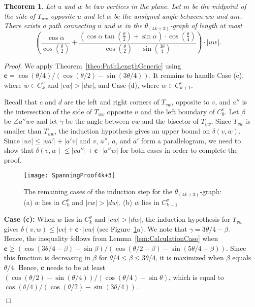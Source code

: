 \documentclass[12pt]{article}
\newtheorem{theo}[defin]{Theorem}
\newenvironment{theorem}{\begin{theo} \sl}{\end{theo}}
\newenvironment{proof}{\emph{Proof.}}{\hfill $\Box$\\}
\newcommand{\graph}[1]{\ensuremath{\theta_{(4 k + #1)}}-graph\xspace}
\newcommand{\canon}[2]{\ensuremath{T_{#1 #2}}}
\newcommand{\const}{\ensuremath{\boldsymbol{c}}\xspace}
\begin{document}
\begin{theorem}
  \label{theo:PathLength4k+3}
  Let $u$ and $w$ be two vertices in the plane. Let $m$ be the midpoint of the side of \canon{u}{w} opposite $u$ and let $\alpha$ be the unsigned angle between $u w$ and $u m$. There exists a path connecting $u$ and $w$ in the \graph{3} of length at most 
  \[\left( \frac{\cos \alpha}{\cos \left(\frac{\theta}{2}\right)} + \frac{\left( \cos \alpha \tan \left(\frac{\theta}{2}\right) + \sin \alpha \right) \cdot \cos \left(\frac{\theta}{4}\right)}{\cos \left(\frac{\theta}{2}\right) - \sin \left(\frac{3\theta}{4}\right)} \right) \cdot |u w|.\] 
\end{theorem}
\begin{proof}
  We apply Theorem~\ref{theo:PathLengthGeneric} using $\const = \cos (\theta/4) / (\cos (\theta/2) - \sin (3\theta/4))$. It remains to handle Case (c), where $w \in C_k^v$ and $|c w| > |d w|$, and Case (d), where $w \in C_{k+1}^v$. 

  Recall that $c$ and $d$ are the left and right corners of \canon{v}{w}, opposite to $v$, and $a''$ is the intersection of the side of $\canon{u}{w}$ opposite $u$ and the left boundary of $C_0^v$. Let $\beta$ be $\angle a'' w v$ and let $\gamma$ be the angle between $v w$ and the bisector of \canon{v}{w}. Since \canon{v}{w} is smaller than \canon{u}{w}, the induction hypothesis gives an upper bound on $\delta(v, w)$. Since $|u v| \leq |u a'| + |a' v|$ and $v$, $a''$, $a$, and $a'$ form a parallelogram, we need to show that $\delta(v, w) \leq |v a''| + \const \cdot |a'' w|$ for both cases in order to complete the proof. 

  \begin{figure}[ht]
    \begin{center}
      \texttt{[image: SpanningProof4k+3]}
    \end{center}
    \caption{The remaining cases of the induction step for the \graph{3}: (a) $w$ lies in $C_k^v$ and $|c w| > |d w|$, (b) $w$ lies in $C_{k+1}^v$}
    \label{fig:SpanningProof4k+3}
  \end{figure}

  \textbf{Case (c):} When $w$ lies in $C_k^v$ and $|c w| > |d w|$, the induction hypothesis for \canon{v}{w} gives $\delta(v, w) \leq |v c| + \const \cdot |c w|$ (see Figure~\ref{fig:SpanningProof4k+3}a). We note that $\gamma = 3\theta/4 - \beta$. Hence, the inequality follows from Lemma~\ref{lem:CalculationCase} when $\const \geq (\cos (3\theta/4 - \beta) - \sin \beta) / (\cos (\theta/2 - \beta) - \sin (5\theta/4 - \beta))$. Since this function is decreasing in $\beta$ for $\theta/4 \leq \beta \leq 3\theta/4$, it is maximized when $\beta$ equals $\theta/4$. Hence, $\const$ needs to be at least $(\cos (\theta/2) - \sin (\theta/4)) / (\cos (\theta/4) - \sin \theta)$, which is equal to $\cos (\theta/4) / (\cos (\theta/2) - \sin (3\theta/4))$. 


\end{proof}
\end{document}

